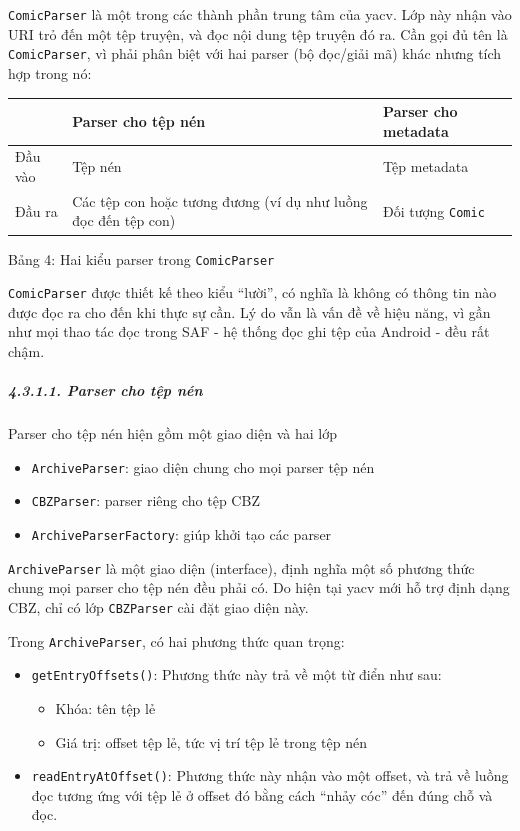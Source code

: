 \documentclass[
]{article}
\providecommand{\tightlist}{%
  \setlength{\itemsep}{0pt}\setlength{\parskip}{0pt}}
\begin{document}
\texttt{ComicParser} là một trong các thành phần trung tâm của yacv. Lớp
này nhận vào URI trỏ đến một tệp truyện, và đọc nội dung tệp truyện đó
ra. Cần gọi đủ tên là \texttt{ComicParser}, vì phải phân biệt với hai
parser (bộ đọc/giải mã) khác nhưng tích hợp trong nó:

\begin{longtable}[]{@{}
  >{\raggedright\arraybackslash}p{}
  >{\raggedright\arraybackslash}p{}
  >{\raggedright\arraybackslash}p{}@{}}
\toprule
& Parser cho tệp nén & Parser cho metadata \\
\midrule
\endhead
Đầu vào & Tệp nén & Tệp metadata \\
Đầu ra & Các tệp con hoặc tương đương (ví dụ như luồng đọc đến tệp con)
& Đối tượng \texttt{Comic} \\
\bottomrule
\end{longtable}

Bảng 4: Hai kiểu parser trong \texttt{ComicParser}

\texttt{ComicParser} được thiết kế theo kiểu ``lười'', có nghĩa là không
có thông tin nào được đọc ra cho đến khi thực sự cần. Lý do vẫn là vấn
đề về hiệu năng, vì gần như mọi thao tác đọc trong SAF - hệ thống đọc
ghi tệp của Android - đều rất chậm.

\hypertarget{parser-cho-tux1ec7p-nuxe9n}{%
\subparagraph{4.3.1.1. Parser cho tệp
nén}\label{parser-cho-tux1ec7p-nuxe9n}}

Parser cho tệp nén hiện gồm một giao diện và hai lớp

\begin{itemize}
\tightlist
\item
  \texttt{ArchiveParser}: giao diện chung cho mọi parser tệp nén
\item
  \texttt{CBZParser}: parser riêng cho tệp CBZ
\item
  \texttt{ArchiveParserFactory}: giúp khởi tạo các parser
\end{itemize}

\texttt{ArchiveParser} là một giao diện (interface), định nghĩa một số
phương thức chung mọi parser cho tệp nén đều phải có. Do hiện tại yacv
mới hỗ trợ định dạng CBZ, chỉ có lớp \texttt{CBZParser} cài đặt giao
diện này.

Trong \texttt{ArchiveParser}, có hai phương thức quan trọng:

\begin{itemize}
\item
  \texttt{getEntryOffsets()}: Phương thức này trả về một từ điển như
  sau:

  \begin{itemize}
  \tightlist
  \item
    Khóa: tên tệp lẻ
  \item
    Giá trị: offset tệp lẻ, tức vị trí tệp lẻ trong tệp nén
  \end{itemize}
\item
  \texttt{readEntryAtOffset()}: Phương thức này nhận vào một offset, và
  trả về luồng đọc tương ứng với tệp lẻ ở offset đó bằng cách ``nhảy
  cóc'' đến đúng chỗ và đọc.
\end{itemize}
\end{document}
